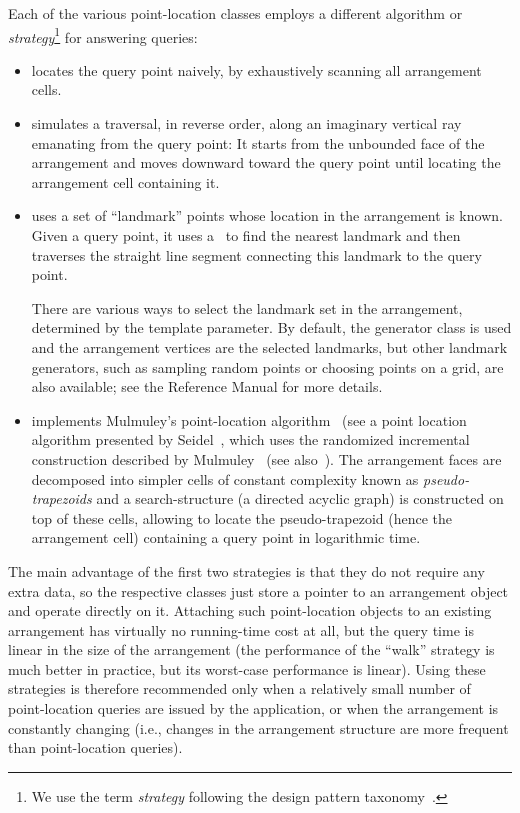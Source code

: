 Each of the various point-location classes employs a different
algorithm or {\em strategy}\footnote{We use the term {\em strategy}
following the design pattern taxonomy~\cite{cgal:ghjv-dpero-95}.}
for answering queries:
\begin{itemize}
\item {} locates the query
point naively, by exhaustively scanning all arrangement cells.
%
\item {}
simulates a traversal, in reverse order, along an imaginary vertical
ray emanating
from the query point: It starts from the unbounded face of the
arrangement and moves downward toward the query point until
locating the arrangement cell containing it.
%
\item {}
uses a set of ``landmark'' points whose location in the
arrangement is known. Given a query point, it uses a \kdtree\ to
find the nearest landmark and then traverses the straight line
segment connecting this landmark to the query point.

There are various ways to select the landmark set in the
arrangement, determined by the  template parameter.
By default, the generator
class  is used and the
arrangement vertices are the selected landmarks, but other
landmark generators, such as sampling random points or
choosing points on a grid, are also available; see the
Reference Manual for more details.
%
\item {} implements
Mulmuley's point-location algorithm~\cite{m-fppa-90} (see
a point location algorithm presented by Seidel~\cite{s-sfira-91}, which uses the 
randomized incremental construction described by Mulmuley~\cite{m-fppa-90} (see
also~\cite[Chapter~6]{bkos-cgaa-00}). The
arrangement faces are decomposed into simpler cells of constant
complexity known as {\em pseudo-trapezoids} and a search-structure
(a directed acyclic graph) is constructed on top of these cells,
allowing to locate the pseudo-trapezoid (hence the arrangement
cell) containing a query point in logarithmic time.
\end{itemize}

The main advantage of the first two strategies is that they do not
require any extra data, so the respective classes just store a
pointer to an arrangement object and operate directly on it.
Attaching such point-location objects to an existing arrangement
has virtually no running-time cost at all, but the query time is
linear in the size of the arrangement (the performance of the
``walk'' strategy is much better in practice, but its worst-case
performance is linear). Using these strategies is therefore
recommended only when a relatively small number of point-location
queries are issued by the application, or when the arrangement is
constantly changing (i.e., changes in the arrangement structure
are more frequent than point-location queries).

